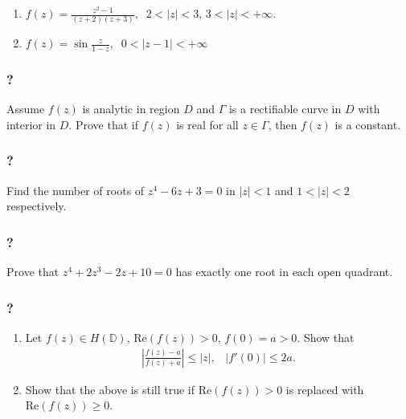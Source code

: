 \begin{enumerate}
\def\labelenumi{(\alph{enumi})}
\item
  \(\displaystyle f(z) = \frac{z^2 - 1}{ (z+2)(z+3)}, \; \; 2 < |z| < 3\),
  \(3 < |z| < + \infty\).
\item
  \(\displaystyle f(z) = \sin \frac{z}{1-z}, \; \; 0 < |z-1| < + \infty\)
\end{enumerate}

\hypertarget{section-145}{%
\subsubsection{?}\label{section-145}}

Assume \(f(z)\) is analytic in region \(D\) and \(\Gamma\) is a
rectifiable curve in \(D\) with interior in \(D\). Prove that if
\(f(z)\) is real for all \(z \in \Gamma\), then \(f(z)\) is a constant.

\hypertarget{section-146}{%
\subsubsection{?}\label{section-146}}

Find the number of roots of \(z^4 - 6z + 3 =0\) in \(|z|<1\) and
\(1 < |z| < 2\) respectively.

\hypertarget{section-147}{%
\subsubsection{?}\label{section-147}}

Prove that \(z^4 + 2 z^3 - 2z + 10 =0\) has exactly one root in each
open quadrant.

\hypertarget{section-148}{%
\subsubsection{?}\label{section-148}}

\begin{enumerate}
\def\labelenumi{(\arabic{enumi})}
\item
  Let \(f(z) \in H({\mathbb D})\), \(\text{Re}(f(z)) >0\),
  \(f(0)= a>0\). Show that
  \begin{align*}|\frac{f(z)-a}{f(z)+a}| \leq |z|, \; \; \;
  |f'(0)| \leq 2a.\end{align*}
\item
  Show that the above is still true if \(\text{Re}(f(z)) >0\) is
  replaced with \(\text{Re}(f(z)) \geq 0\).
\end{enumerate}

